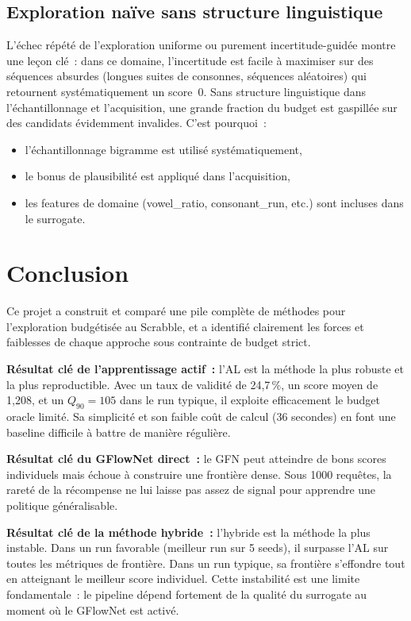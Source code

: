\documentclass[10pt]{article}
\begin{document}
\subsection{Exploration naïve sans structure linguistique}

L'échec répété de l'exploration uniforme ou purement incertitude-guidée montre une leçon clé~: dans ce domaine, l'incertitude est facile à maximiser sur des séquences absurdes (longues suites de consonnes, séquences aléatoires) qui retournent systématiquement un score~0. Sans structure linguistique dans l'échantillonnage et l'acquisition, une grande fraction du budget est gaspillée sur des candidats évidemment invalides. C'est pourquoi~:
\begin{itemize}[noitemsep]
  \item l'échantillonnage bigramme est utilisé systématiquement,
  \item le bonus de plausibilité est appliqué dans l'acquisition,
  \item les features de domaine (vowel\_ratio, consonant\_run, etc.) sont incluses dans le surrogate.
\end{itemize}

\section{Conclusion}

Ce projet a construit et comparé une pile complète de méthodes pour l'exploration budgétisée au Scrabble, et a identifié clairement les forces et faiblesses de chaque approche sous contrainte de budget strict.

\textbf{Résultat clé de l'apprentissage actif~:} l'AL est la méthode la plus robuste et la plus reproductible. Avec un taux de validité de 24,7\,\%, un score moyen de 1,208, et un $Q_{90}=105$ dans le run typique, il exploite efficacement le budget oracle limité. Sa simplicité et son faible coût de calcul (36 secondes) en font une baseline difficile à battre de manière régulière.

\textbf{Résultat clé du GFlowNet direct~:} le GFN peut atteindre de bons scores individuels mais échoue à construire une frontière dense. Sous 1000 requêtes, la rareté de la récompense ne lui laisse pas assez de signal pour apprendre une politique généralisable.

\textbf{Résultat clé de la méthode hybride~:} l'hybride est la méthode la plus instable. Dans un run favorable (meilleur run sur 5 seeds), il surpasse l'AL sur toutes les métriques de frontière. Dans un run typique, sa frontière s'effondre tout en atteignant le meilleur score individuel. Cette instabilité est une limite fondamentale~: le pipeline dépend fortement de la qualité du surrogate au moment où le GFlowNet est activé.
\end{document}
